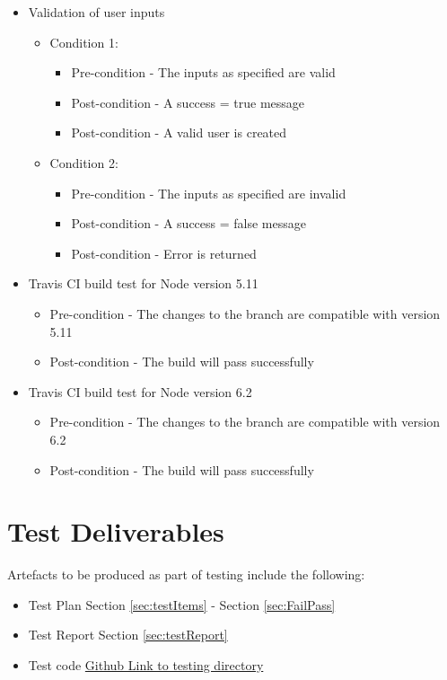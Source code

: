 \documentclass{article}
\begin{document}
\begin{itemize}
\item Validation of user inputs
\begin{itemize}
	\item Condition 1:
	\begin{itemize}
		\item Pre-condition - The inputs as specified are valid
		\item Post-condition - A success = true message
		\item Post-condition - A valid user is created
	\end{itemize}
	\item Condition 2:
	\begin{itemize}
		\item Pre-condition - The inputs as specified are invalid
		\item Post-condition - A success = false message
		\item Post-condition - Error is returned
	\end{itemize}
\end{itemize}

\item Travis CI build test for Node version 5.11
	\begin{itemize}
	\item Pre-condition - The changes to the branch are compatible with version 5.11
	\item Post-condition - The build will pass successfully 
	\end{itemize}	
	
\item Travis CI build test for Node version 6.2
	\begin{itemize}
	\item Pre-condition - The changes to the branch are compatible with version 6.2
	\item Post-condition - The build will pass successfully 
	\end{itemize}

\end{itemize}


\section{Test Deliverables}
Artefacts to be produced as part of testing include the following:
\begin{itemize}
\item Test Plan Section \ref{sec:testItems} - Section \ref{sec:FailPass}
\item Test Report Section \ref{sec:testReport}
\item Test code \href{https://github.com/QuintonWeenink/ValknutSolutions/tree/develop/test}{Github Link to testing directory}
\end{itemize}
\clearpage
\end{document}
